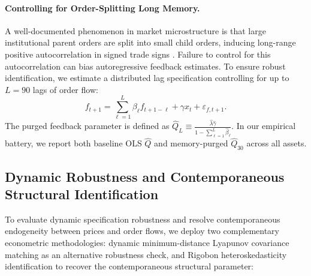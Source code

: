 \documentclass[12pt]{article}
\theoremstyle{definition}
\theoremstyle{remark}
\begin{document}
\paragraph{Controlling for Order-Splitting Long Memory.}
A well-documented phenomenon in market microstructure is that large institutional parent orders are split into small child orders, inducing long-range positive autocorrelation in signed trade signs \citep{bouchaud2004fluctuations,cont2014}. Failure to control for this autocorrelation can bias autoregressive feedback estimates. To ensure robust identification, we estimate a distributed lag specification controlling for up to $L=90$ lags of order flow:
\begin{equation}
f_{t+1} = \sum_{\ell=1}^L \beta_\ell f_{t+1-\ell} + \gamma x_t + \varepsilon_{f, t+1}.
\label{eq:Q_robust}
\end{equation}
The purged feedback parameter is defined as $\hat{Q}_L \equiv \frac{\hat{\lambda} \hat{\gamma}}{1 - \sum_{\ell=1}^L \hat{\beta}_\ell}$. In our empirical battery, we report both baseline OLS $\hat{Q}$ and memory-purged $\hat{Q}_{30}$ across all assets.

\subsection{Dynamic Robustness and Contemporaneous Structural Identification}
To evaluate dynamic specification robustness and resolve contemporaneous endogeneity between prices and order flows, we deploy two complementary econometric methodologies: dynamic minimum-distance Lyapunov covariance matching as an alternative robustness check, and Rigobon heteroskedasticity identification to recover the contemporaneous structural parameter:
\end{document}
